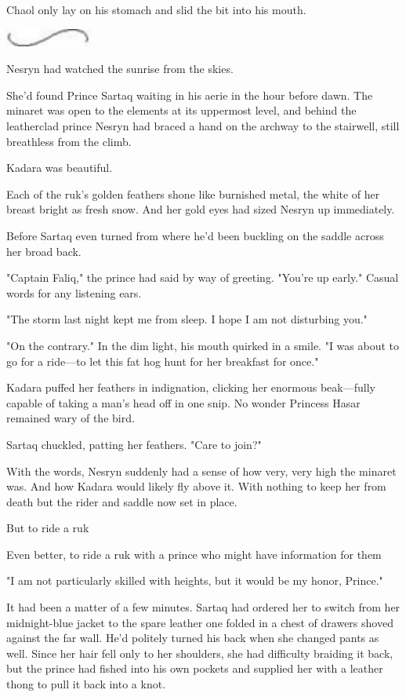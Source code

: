 Chaol only lay on his stomach and slid the bit into his mouth.

\includegraphics[width=1.12in,height=0.24in]{images/seperator}

Nesryn had watched the sunrise from the skies.

She'd found Prince Sartaq waiting in his aerie in the hour before dawn. The minaret was open to the elements at its uppermost level, and behind the leatherclad prince  Nesryn had braced a hand on the archway to the stairwell, still breathless from the climb.

Kadara was beautiful.

Each of the ruk's golden feathers shone like burnished metal, the white of her breast bright as fresh snow. And her gold eyes had sized Nesryn up immediately.

Before Sartaq even turned from where he'd been buckling on the saddle across her broad back.

"Captain Faliq," the prince had said by way of greeting. "You're up early." Casual words for any listening ears.

"The storm last night kept me from sleep. I hope I am not disturbing you."

"On the contrary." In the dim light, his mouth quirked in a smile. "I was about to go for a ride---to let this fat hog hunt for her breakfast for once."

Kadara puffed her feathers in indignation, clicking her enormous beak---fully capable of taking a man's head off in one snip. No wonder Princess Hasar remained wary of the bird.

Sartaq chuckled, patting her feathers. "Care to join?"

With the words, Nesryn suddenly had a sense of how very, very high the minaret was. And how Kadara would likely fly above it. With nothing to keep her from death but the rider and saddle now set in place.

But to ride a ruk 

Even better, to ride a ruk with a prince who might have information for them



"I am not particularly skilled with heights, but it would be my honor, Prince."

It had been a matter of a few minutes. Sartaq had ordered her to switch from her midnight-blue jacket to the spare leather one folded in a chest of drawers shoved against the far wall. He'd politely turned his back when she changed pants as well. Since her hair fell only to her shoulders, she had difficulty braiding it back, but the prince had fished into his own pockets and supplied her with a leather thong to pull it back into a knot.

